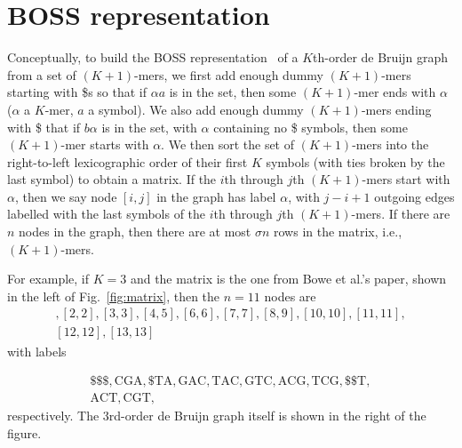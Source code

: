 \section{BOSS representation}
\label{sec:BOSS}


Conceptually, to build the BOSS representation~\cite{BOSS12} of a $K$th-order de Bruijn graph from a set of \((K + 1)\)-mers, we first add enough dummy \((K + 1)\)-mers starting with \$s so that if \(\alpha a\) is in the set, then some \((K + 1)\)-mer ends with $\alpha$ ($\alpha$ a $K$-mer, $a$ a symbol).  We also add enough dummy \((K + 1)\)-mers ending with \$ that if \(b \alpha\) is in the set, with $\alpha$ containing no \$ symbols, then some \((K + 1)\)-mer starts with $\alpha$.  We then sort the set of \((K + 1)\)-mers into the right-to-left lexicographic order of their first $K$ symbols (with ties broken by the last symbol) to obtain a matrix.  If the $i$th through $j$th \((K + 1)\)-mers start with $\alpha$, then we say node \([i, j]\) in the graph has label $\alpha$, with \(j - i + 1\) outgoing edges labelled with the last symbols of the $i$th through $j$th \((K + 1)\)-mers.  If there are $n$ nodes in the graph, then there are at most \(\sigma n\) rows in the matrix, i.e., \((K + 1)\)-mers.

For example, if \(K = 3\) and the matrix is the one from Bowe et al.'s paper,
shown in the left of Fig.~\ref{fig:matrix}, then the \(n = 11\) nodes are
\begin{gather*}
 [1, 1], [2, 2], [3, 3], [4, 5], [6, 6], [7, 7], [8, 9], [10,
 10], [11, 11], \\ [12, 12], [13, 13]
\end{gather*}
with labels

\begin{gather*}
 \mathrm{\$\$\$}, \mathrm{CGA}, \mathrm{\$TA}, \mathrm{GAC}, \mathrm{TAC},
\mathrm{GTC}, \mathrm{ACG}, \mathrm{TCG}, \mathrm{\$\$T}, \\
\mathrm{ACT}, \mathrm{CGT},
\end{gather*}%
respectively. The 3rd-order de Bruijn graph itself is shown in the right of the figure.

